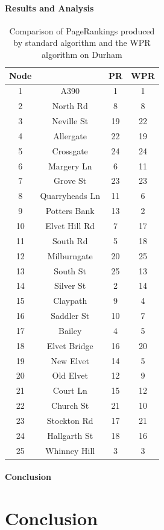 \documentclass[11pt]{report}
\begin{document}
\subsubsection{Results and Analysis} \label{sec:results}
\begin{table}[h] \caption{Comparison of PageRankings produced by standard algorithm and the WPR algorithm on Durham}
 \centering
 \begin{tabular} {c c| c c} 
 Node & & PR & WPR \\ [0.5ex] 
 \hline
 1&A390&1&1\\
 2&North Rd&8&8\\
 3&Neville St&19&22\\
 4&Allergate&22&19\\
 5&Crossgate&24&24\\
 6&Margery Ln&6&11\\
 7&Grove St&23&23\\
 8&Quarryheads Ln&11&6\\
 9&Potters Bank&13&2\\
 10&Elvet Hill Rd&7&17\\
 11&South Rd&5&18\\
 12&Milburngate&20&25\\
 13&South St&25&13\\
 14&Silver St&2&14\\
 15&Claypath&9&4\\
 16&Saddler St&10&7\\
 17&Bailey&4&5\\
 18&Elvet Bridge&16&20\\
 19&New Elvet&14&5\\
 20&Old Elvet&12&9\\
 21&Court Ln&15&12\\
 22&Church St&21&10\\
 23&Stockton Rd&17&21\\
 24&Hallgarth St&18&16\\
 25&Whinney Hill&3&3\\
 
 \end{tabular}
 \label{Table:Durham comparison}
\end{table}

\subsubsection{Conclusion} \label{sec:Durham conc}

\chapter{Conclusion} \label{chap:Conclusion}


\end{document}
